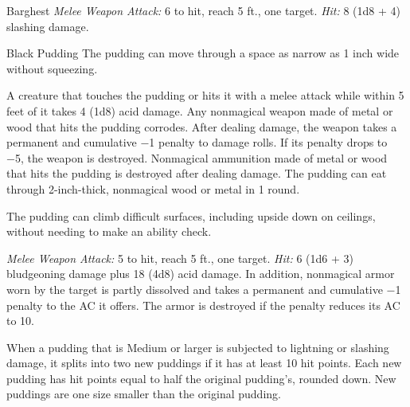 \documentclass[10pt,a4paper,twoside,bg=print,twocolumn,openany,nodeprecatedcode]{dndbook}
\begin{document}
\begin{DndMonster}[float=t]{Barghest}
\textsl{Melee Weapon Attack:} 6 to hit, reach 5 ft., one target. \textsl{Hit:} 8 (1d8 + 4) slashing damage.

\end{DndMonster}



\begin{DndMonster}[float=t]{Black Pudding}
\DndMonsterBasics[
armor-class = {7},
hit-points = {\DndDice{10d10 + 30}},
speed = {20 ft., climb 20 ft.}
]
\DndMonsterAbilityScores[
 str = 16,
 dex = 5,
 con = 16,
 int = 1,
 wis = 6,
 cha = 1
]
\DndMonsterDetails[
damage-immunities = {acid, cold, lightning, slashing},
condition-immunities = {blinded, charmed, deafened, exhaustion, frightened, prone},
senses = {blindsight 60 ft. (blind beyond this radius), passive perception 8},
challenge = 4,
]
The pudding can move through a space as narrow as 1 inch wide without squeezing.

A creature that touches the pudding or hits it with a melee attack while within 5 feet of it takes 4 (1d8) acid damage. Any nonmagical weapon made of metal or wood that hits the pudding corrodes. After dealing damage, the weapon takes a permanent and cumulative −1 penalty to damage rolls. If its penalty drops to −5, the weapon is destroyed. Nonmagical ammunition made of metal or wood that hits the pudding is destroyed after dealing damage. The pudding can eat through 2-inch-thick, nonmagical wood or metal in 1 round.

The pudding can climb difficult surfaces, including upside down on ceilings, without needing to make an ability check.

\textsl{Melee Weapon Attack:} 5 to hit, reach 5 ft., one target. \textsl{Hit:} 6 (1d6 + 3) bludgeoning damage plus 18 (4d8) acid damage. In addition, nonmagical armor worn by the target is partly dissolved and takes a permanent and cumulative −1 penalty to the AC it offers. The armor is destroyed if the penalty reduces its AC to 10.

When a pudding that is Medium or larger is subjected to lightning or slashing damage, it splits into two new puddings if it has at least 10 hit points. Each new pudding has hit points equal to half the original pudding's, rounded down. New puddings are one size smaller than the original pudding.

\end{DndMonster}
\end{document}
